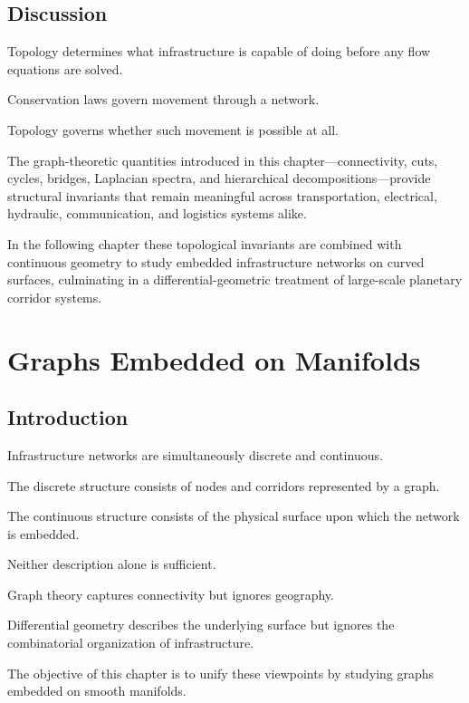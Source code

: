 \documentclass[11pt,fleqn]{book}
\numberwithin{equation}{chapter}
\theoremstyle{plain}
\theoremstyle{definition}
\theoremstyle{remark}
\begin{document}
\section{Discussion}

Topology determines what infrastructure is capable of doing before any
flow equations are solved.

Conservation laws govern movement through a network.

Topology governs whether such movement is possible at all.

The graph-theoretic quantities introduced in this chapter—connectivity,
cuts, cycles, bridges, Laplacian spectra, and hierarchical
decompositions—provide structural invariants that remain meaningful
across transportation, electrical, hydraulic, communication, and
logistics systems alike.

In the following chapter these topological invariants are combined with
continuous geometry to study embedded infrastructure networks on curved
surfaces, culminating in a differential-geometric treatment of
large-scale planetary corridor systems.

\chapter{Graphs Embedded on Manifolds}

\section{Introduction}

Infrastructure networks are simultaneously discrete and continuous.

The discrete structure consists of nodes and corridors represented by a
graph.

The continuous structure consists of the physical surface upon which the
network is embedded.

Neither description alone is sufficient.

Graph theory captures connectivity but ignores geography.

Differential geometry describes the underlying surface but ignores the
combinatorial organization of infrastructure.

The objective of this chapter is to unify these viewpoints by studying
graphs embedded on smooth manifolds.

\end{document}
